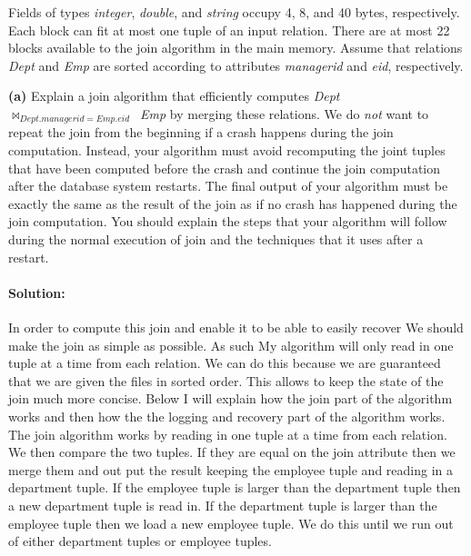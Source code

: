 \documentclass[11pt]{article}
\renewcommand\part[1]{\vspace{.10in}\textbf{(#1)}}
\begin{document}
Fields of types \textit{integer}, \textit{double}, and \textit{string} occupy 4, 8, and 40 bytes, respectively. 
Each block can fit at most one tuple of an input relation. There are at most 22 blocks available to the join algorithm in the main memory.
Assume that relations {\it Dept} and {\it Emp} are sorted according to attributes {\it managerid} and {\it eid}, respectively.

\part{a}
Explain a join algorithm that efficiently computes \textit{Dept}~$\bowtie_{Dept.managerid=Emp.eid}$~\textit{Emp} by merging these relations.
We do {\it not} want to repeat the join from the beginning if a crash happens during the join computation. Instead, your algorithm must avoid recomputing the joint tuples that have been computed before the crash and continue the join computation after the database system restarts.
The final output of your algorithm must be exactly the same as the result of the join as if no crash has happened during the join computation.
You should explain the steps that your algorithm will follow during the normal execution of join and the techniques that it uses after a restart.\\

\paragraph{\textbf{Solution:}} \hfill \break
In order to compute this join and enable it to be able to easily recover We should make the join as simple as possible. As such My algorithm will only read in one tuple at a time from each relation. We can do this because we are guaranteed that we are given the files in sorted order. This allows to keep the state of the join much more concise. Below I will explain how the join part of the algorithm works and then how the the logging and recovery part of the algorithm works.\\

The join algorithm works by reading in one tuple at a time from each relation. We then compare the two tuples. If they are equal on the join attribute then we merge them and out put the result keeping the employee tuple and reading in a department tuple. If the employee tuple is larger than the department tuple then a new department tuple is read in. If the department tuple is larger than the employee tuple then we load a new employee tuple. We do this until we run out of either department tuples or employee tuples.\\
\end{document}
